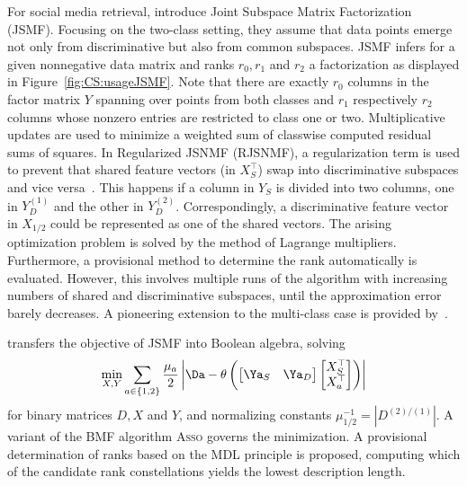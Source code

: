 For social media retrieval, \cite{gupta2010nonnegative} introduce Joint Subspace Matrix Factorization (JSMF). Focusing on the two-class setting, they assume that data points emerge not only from discriminative but also from common subspaces. JSMF infers for a given nonnegative data matrix and ranks $r_0,r_1$ and $r_2$ a factorization as displayed in Figure~\ref{fig:CS:usageJSMF}. Note that there are exactly $r_0$ columns in the factor matrix $Y$ spanning over points from both classes and $r_1$ respectively $r_2$ columns whose nonzero entries are restricted to class one or two. Multiplicative updates are used to minimize a weighted sum of classwise computed residual sums of squares.
In Regularized JSNMF (RJSNMF), a regularization term is used to prevent that shared feature vectors (in $X_S^\top $) swap into discriminative subspaces and vice versa~\citep{gupta2013regularized}. This happens if a column in $Y_S$ is divided into two columns, one in $Y_D^{(1)}$ and the other in $Y_D^{(2)}$. Correspondingly, a discriminative feature vector in $X_{1/2}$ could be represented as one of the shared vectors. The arising optimization problem is solved by the method of Lagrange multipliers. Furthermore, a provisional method to determine the rank automatically is evaluated. However, this involves multiple runs of the algorithm with increasing numbers of shared and discriminative subspaces, until the approximation error barely decreases.
A pioneering extension to the multi-class case  is provided by~\cite{gupta2014matrix}.

\cite{miettienen2012finding} transfers the objective of JSMF into Boolean algebra, solving
\[\min_{X,Y}\sum_{a\in\{1,2\}}\frac{\mu_a}{2}\left|\Da-\theta\left(\begin{bmatrix}
\Ya_{S} & \Ya_D
\end{bmatrix} \begin{bmatrix}
	X_S^\top \\
    X_a^\top 
\end{bmatrix}\right)\right|\]
for binary matrices $D, X$ and $Y$, and normalizing constants $\mu_{1/2}^{-1} =|D^{(2)/(1)}|$.  A variant of the BMF algorithm \textsc{Asso} governs the minimization. A provisional determination of ranks based on the MDL principle is proposed, computing which of the candidate rank constellations yields the lowest description length.

